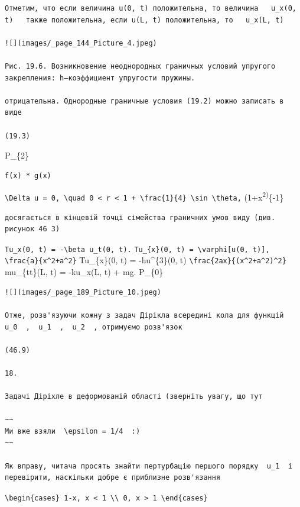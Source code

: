 \documentclass[
  ukrainian,
]{article}
\begin{document}
\begin{verbatim}
Отметим, что если величина u(0, t) положительна, то величина   u_x(0, t)   также положительна, если u(L, t) положительна, то   u_x(L, t)

![](images/_page_144_Picture_4.jpeg)

Рис. 19.6. Возникновение неоднородных граничных условий упругого закрепления: h—коэффициент упругости пружины.

отрицательна. Однородные граничные условия (19.2) можно записать в виде

(19.3)
\end{verbatim}

P\_\{2\}

\begin{verbatim}
f(x) * g(x)
\end{verbatim}

\texttt{\textbackslash{}Delta\ u\ =\ 0,\ \textbackslash{}quad\ 0\ \textless{}\ r\ \textless{}\ 1\ +\ \textbackslash{}frac\{1\}\{4\}\ \textbackslash{}sin\ \textbackslash{}theta,}
(1+x\textsuperscript{2)}\{-1\}

\begin{verbatim}
досягається в кінцевій точці сімейства граничних умов виду (див. рисунок 46 3)
\end{verbatim}

\texttt{Tu\_x(0,\ t)\ =\ -\textbackslash{}beta\ u\_t(0,\ t).}
\texttt{Tu\_\{x\}(0,\ t)\ =\ \textbackslash{}varphi{[}u(0,\ t){]},}
\texttt{\textbackslash{}frac\{a\}\{x\^{}2+a\^{}2\}} Tu\_\{x\}(0, t) =
-hu\^{}\{3\}(0, t)
\texttt{\textbackslash{}frac\{2ax\}\{(x\^{}2+a\^{}2)\^{}2\}}
mu\_\{tt\}(L, t) = -ku\_x(L, t) + mg. P\_\{0\}

\begin{verbatim}
![](images/_page_189_Picture_10.jpeg)

Отже, розв'язуючи кожну з задач Дірікла всередині кола для функцій  u_0  ,  u_1  ,  u_2  , отримуємо розв'язок

(46.9)

18.

Задачі Діріхле в деформованій області (зверніть увагу, що тут

~~
Ми вже взяли  \epsilon = 1/4  :)
~~

Як вправу, читача просять знайти пертурбацію першого порядку  u_1  і перевірити, наскільки добре є приблизне розв'язання
\end{verbatim}

\texttt{\textbackslash{}begin\{cases\}\ 1-\textbar{}x\textbar{},\ \textbar{}x\textbar{}\ \textless{}\ 1\ \textbackslash{}\textbackslash{}\ 0,\ \textbar{}x\textbar{}\ \textgreater{}\ 1\ \textbackslash{}end\{cases\}}
\end{document}
